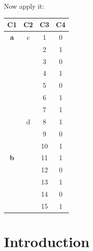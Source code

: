 \documentclass[
]{book}
\newenvironment{Shaded}{\begin{snugshade}}{\end{snugshade}}
\newcommand{\DataTypeTok}[1]{\textcolor[rgb]{0.13,0.29,0.53}{#1}}
\newcommand{\DecValTok}[1]{\textcolor[rgb]{0.00,0.00,0.81}{#1}}
\newcommand{\KeywordTok}[1]{\textcolor[rgb]{0.13,0.29,0.53}{\textbf{#1}}}
\newcommand{\NormalTok}[1]{#1}
\newcommand{\OperatorTok}[1]{\textcolor[rgb]{0.81,0.36,0.00}{\textbf{#1}}}
\newcommand{\StringTok}[1]{\textcolor[rgb]{0.31,0.60,0.02}{#1}}
\begin{document}
Now apply it:

\begin{Shaded}
\end{Shaded}

\begin{table}
\centering
\begin{tabular}[t]{>{}c|c|c|c}
\hline
C1 & C2 & C3 & C4\\
\hline
\textbf{a} & c & 1 & 0\\
\cline{1-4}
 &  & 2 & 1\\
\cline{3-4}
 &  & 3 & 0\\
\cline{3-4}
 &  & 4 & 1\\
\cline{3-4}
 &  & 5 & 0\\
\cline{3-4}
 &  & 6 & 1\\
\cline{3-4}
 & \multirow[t]{-6}{*}{\centering\arraybackslash } & 7 & 1\\
\cline{2-4}
 & d & 8 & 1\\
\cline{2-4}
 &  & 9 & 0\\
\cline{3-4}
\multirow[t]{-9}{*}{\centering\arraybackslash \textbf{}} &  & 10 & 1\\
\cline{1-1}
\cline{3-4}
\textbf{b} &  & 11 & 1\\
\cline{1-1}
\cline{3-4}
 &  & 12 & 0\\
\cline{3-4}
 &  & 13 & 1\\
\cline{3-4}
 &  & 14 & 0\\
\cline{3-4}
\multirow[t]{-4}{*}{\centering\arraybackslash \textbf{}} & \multirow[t]{-7}{*}{\centering\arraybackslash } & 15 & 1\\
\hline
\end{tabular}
\end{table}

\hypertarget{standalone-cad-radiologists-introduction}{%
\section{Introduction}\label{standalone-cad-radiologists-introduction}}
\end{document}
